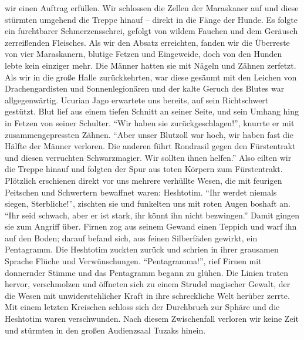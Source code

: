 wir einen Auftrag erfüllen. Wir schlossen die Zellen der Maraskaner auf und diese stürmten umgehend die Treppe hinauf -- direkt in die Fänge der Hunde. Es folgte ein furchtbarer Schmerzensschrei, gefolgt von wildem Fauchen und dem Geräusch zerreißenden Fleisches. Als wir den Absatz erreichten, fanden wir die Überreste von vier Maraskanern, blutige Fetzen und Eingeweide, doch von den Hunden lebte kein einziger mehr. Die Männer hatten sie mit Nägeln und Zähnen zerfetzt. Als wir in die große Halle zurückkehrten, war diese gesäumt mit den Leichen von Drachengardisten und Sonnenlegionären und der kalte Geruch des Blutes war allgegenwärtig. Ucurian Jago erwartete uns bereits, auf sein Richtschwert gestützt. Blut lief aus einem tiefen Schnitt an seiner Seite, und sein Umhang hing in Fetzen von seiner Schulter. ``Wir haben sie zurückgeschlagen!'', knurrte er mit zusammengepressten Zähnen. ``Aber unser Blutzoll war hoch, wir haben fast die Hälfte der Männer verloren. Die anderen führt Rondrasil gegen den Fürstentrakt und diesen verruchten Schwarzmagier. Wir sollten ihnen helfen.'' Also eilten wir die Treppe hinauf und folgten der Spur aus toten Körpern zum Fürstentrakt. Plötzlich erschienen direkt vor uns mehrere verhüllte Wesen, die mit feurigen Peitschen und Schwertern bewaffnet waren: Heshtotim. ``Ihr werdet niemals siegen, Sterbliche!'', zischten sie und funkelten uns mit roten Augen boshaft an. ``Ihr seid schwach, aber er ist stark, ihr könnt ihn nicht bezwingen.'' Damit gingen sie zum Angriff über. Firnen zog aus seinem Gewand einen Teppich und warf ihn auf den Boden; darauf befand sich, aus feinen Silberfäden gewirkt, ein Pentagramm. Die Heshtotim zuckten zurück und schrien in ihrer grausamen Sprache Flüche und Verwünschungen. ``Pentagramma!'', rief Firnen mit donnernder Stimme und das Pentagramm begann zu glühen. Die Linien traten hervor, verschmolzen und öffneten sich zu einem Strudel magischer Gewalt, der die Wesen mit unwiderstehlicher Kraft in ihre schreckliche Welt herüber zerrte. Mit einem letzten Kreischen schloss sich der Durchbruch zur Sphäre und die Heshtotim waren verschwunden. Nach diesem Zwischenfall verloren wir keine Zeit und stürmten in den großen Audienzsaal Tuzaks hinein.


